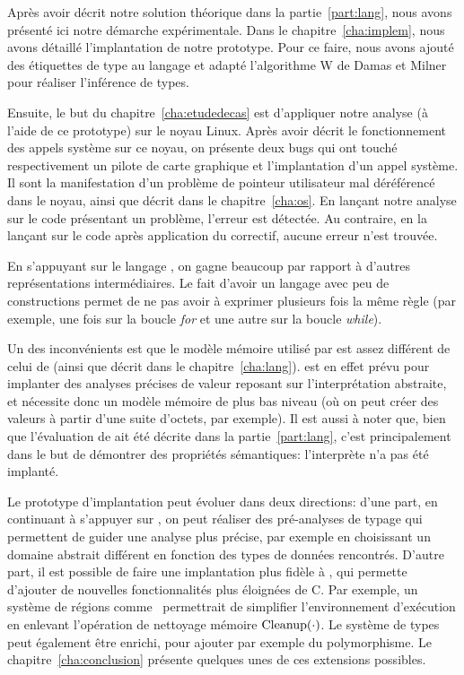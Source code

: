Après avoir décrit notre solution théorique dans la partie~\ref{part:lang}, nous
avons présenté ici notre démarche expérimentale. Dans le
chapitre~\ref{cha:implem}, nous avons détaillé l'implantation de notre
prototype. Pour ce faire, nous avons ajouté des étiquettes de type au langage
\newspeak et adapté l'algorithme W de Damas et Milner pour réaliser l'inférence
de types.

Ensuite, le but du chapitre~\ref{cha:etudedecas} est d'appliquer notre analyse
(à l'aide de ce prototype) sur le noyau Linux. Après avoir décrit le
fonctionnement des appels système sur ce noyau, on présente deux bugs qui ont
touché respectivement un pilote de carte graphique et l'implantation d'un appel
système. Il sont la manifestation d'un problème de pointeur utilisateur mal
déréférencé dans le noyau, ainsi que décrit dans le chapitre~\ref{cha:os}. En
lançant notre analyse sur le code présentant un problème, l'erreur est détectée.
Au contraire, en la lançant sur le code après application du correctif, aucune
erreur n'est trouvée.

En s'appuyant sur le langage \newspeak, on gagne beaucoup par rapport à d'autres
représentations intermédiaires. Le fait d'avoir un langage avec peu de
constructions permet de ne pas avoir à exprimer plusieurs fois la même règle
(par exemple, une fois sur la boucle \emph{for} et une autre sur la boucle
\emph{while}).


Un des inconvénients est que le modèle mémoire utilisé par \newspeak est assez
différent de celui de \langname (ainsi que décrit dans le
chapitre~\ref{cha:lang}). \newspeak est en effet prévu pour implanter des
analyses précises de valeur reposant sur l'interprétation abstraite, et
nécessite donc un modèle mémoire de plus bas niveau (où on peut créer des
valeurs à partir d'une suite d'octets, par exemple). Il est aussi à noter que,
bien que l'évaluation de \langname ait été décrite dans la
partie~\ref{part:lang}, c'est principalement dans le but de démontrer des
propriétés sémantiques: l'interprète n'a pas été implanté.

Le prototype d'implantation peut évoluer dans deux directions: d'une part, en
continuant à s'appuyer sur \newspeak, on peut réaliser des pré-analyses de
typage qui permettent de guider une analyse plus précise, par exemple en
choisissant un domaine abstrait différent en fonction des types de données
rencontrés. D'autre part, il est possible de faire une implantation plus fidèle
à \langname, qui permette d'ajouter de nouvelles fonctionnalités plus éloignées
de C. Par exemple, un système de régions comme~\cite{jfp92} permettrait de
simplifier l'environnement d'exécution en enlevant l'opération de nettoyage
mémoire $\mathrm{Cleanup}(\cdot)$. Le système de types peut également être enrichi, pour
ajouter par exemple du polymorphisme. Le chapitre~\ref{cha:conclusion} présente
quelques unes de ces extensions possibles.


